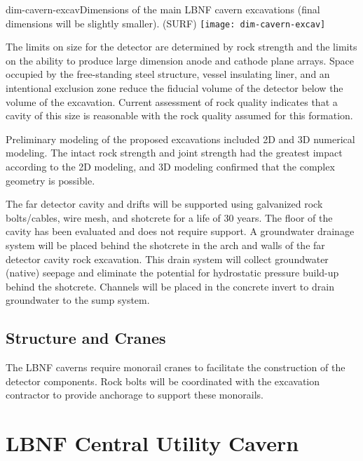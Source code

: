 \begin{cdrfigure}{dim-cavern-excav}{Dimensions of the main LBNF cavern excavations (final dimensions will be slightly smaller). (SURF) }
\texttt{[image: dim-cavern-excav]} 
\end{cdrfigure}

The limits on size for the detector are determined by rock strength and the limits on the ability to produce large dimension anode and cathode plane arrays. Space occupied by the free-standing steel structure, vessel insulating liner, and an intentional exclusion zone reduce the fiducial volume of the detector below the volume of the excavation. Current assessment of rock quality indicates that a cavity of this size is reasonable with the rock quality assumed for this formation.

Preliminary modeling of the proposed excavations included 2D and 3D numerical modeling. The intact rock strength and joint strength had the greatest impact according to the 2D modeling, and 3D modeling confirmed that the complex geometry is possible. 

The far detector cavity and drifts will be supported using galvanized rock bolts/cables, wire mesh, and shotcrete for a life of 30 years. The floor of the cavity has been evaluated and does not require support. 
A groundwater drainage system will be placed behind the shotcrete in the arch and walls of the far detector cavity rock excavation. This drain system will collect groundwater (native) seepage and eliminate the potential for hydrostatic pressure build-up behind the shotcrete. Channels will be placed in the concrete invert to drain groundwater to the sump system. 

\subsection{Structure and Cranes}
\label{sec:fscf-excav-cranes}

The LBNF caverns require monorail cranes to facilitate the construction of the detector components. Rock bolts will be coordinated with the excavation contractor to provide anchorage to support these monorails.

\section{LBNF Central Utility Cavern}
\label{sec:fscf-excav-util-cav}

